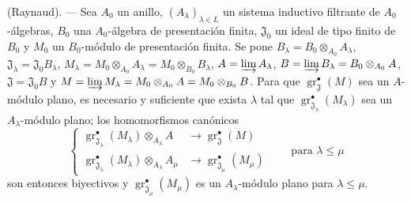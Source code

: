 \begin{theorem}[11.2.9]
\label{IV.11.2.9}
(Raynaud). --- Sea $A_0$ un anillo, $(A_\lambda)_{\lambda\in L}$ un sistema inductivo filtrante de $A_0$-álgebras, $B_0$ una $A_0$-álgebra de presentación finita, $\mathfrak J_0$ un ideal de tipo finito de $B_0$ y $M_0$ un $B_0$-módulo de presentación finita. Se pone $B_\lambda=B_0\otimes_{A_0}A_\lambda$, $\mathfrak J_\lambda=\mathfrak J_0B_\lambda$, $M_\lambda=M_0\otimes_{A_0}A_\lambda=M_0\otimes_{B_0}B_\lambda$, $A=\varinjlim A_\lambda$, $B=\varinjlim B_\lambda=B_0\otimes_{A_0}A$, $\mathfrak J=\mathfrak J_0B$ y $M=\varinjlim M_\lambda=M_0\otimes_{A_0}A=M_0\otimes_{B_0}B$. Para que $\operatorname{gr}_{\mathfrak J}^\bullet(M)$ sea un $A$-módulo plano, es necesario y suficiente que exista $\lambda$ tal que $\operatorname{gr}_{\mathfrak J_\lambda}^\bullet(M_\lambda)$ sea un $A_\lambda$-módulo plano; los homomorfismos canónicos
\begin{equation}
\left\{
\begin{aligned}
\operatorname{gr}_{\mathfrak J_\lambda}^\bullet(M_\lambda)
  \otimes_{A_\lambda}A&\longrightarrow
  \operatorname{gr}_{\mathfrak J}^\bullet(M)\\
\operatorname{gr}_{\mathfrak J_\lambda}^\bullet(M_\lambda)
  \otimes_{A_\lambda}A_\mu&\longrightarrow
  \operatorname{gr}_{\mathfrak J_\mu}^\bullet(M_\mu)
\end{aligned}
\right.
\qquad\text{para }\lambda\leq\mu
\label{IV.11.2.9.1-fr}
\tag{11.2.9.1}
\end{equation}
son entonces biyectivos y $\operatorname{gr}_{\mathfrak J_\mu}^\bullet(M_\mu)$ es un $A_\lambda$-módulo plano para $\lambda\leq\mu$.
\end{theorem}

